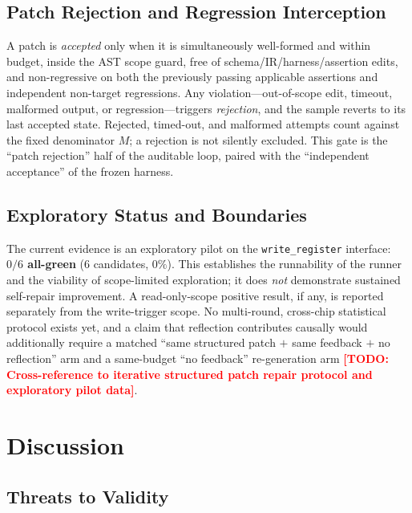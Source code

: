 \documentclass[preprint,review]{elsarticle}
\theoremstyle{definition}
\newcommand{\todo}[1]{\textcolor{red}{\textbf{[TODO: #1]}}}
\begin{document}
\subsection{Patch Rejection and Regression Interception}
\label{sec:patch-rejection}

A patch is \emph{accepted} only when it is simultaneously well-formed and within budget,
inside the AST scope guard, free of schema/IR/harness/assertion edits, and non-regressive on
both the previously passing applicable assertions and independent non-target regressions.
Any violation---out-of-scope edit, timeout, malformed output, or regression---triggers
\emph{rejection}, and the sample reverts to its last accepted state. Rejected, timed-out, and
malformed attempts count against the fixed denominator $M$; a rejection is not silently
excluded. This gate is the ``patch rejection'' half of the auditable loop, paired with the
``independent acceptance'' of the frozen harness.

\subsection{Exploratory Status and Boundaries}
\label{sec:repair-boundary}

The current evidence is an exploratory pilot on the \texttt{write\_register} interface:
\textbf{$0/6$ all-green} ($6$ candidates, $0\%$). This establishes the runnability of the runner and
the viability of scope-limited exploration; it does \emph{not} demonstrate sustained
self-repair improvement. A read-only-scope positive result, if any, is reported separately from the
write-trigger scope. No multi-round, cross-chip statistical protocol exists yet, and a claim
that reflection contributes causally would additionally require a matched
``same structured patch $+$ same feedback $+$ no reflection'' arm and a same-budget
``no feedback'' re-generation arm \todo{Cross-reference to iterative structured patch repair protocol and exploratory pilot data}.

\section{Discussion}
\label{sec:discussion}

\subsection{Threats to Validity}
\label{sec:validity}
\end{document}
